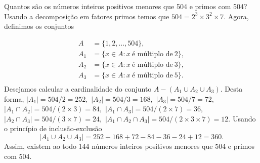 \begin{frame}
\begin{exem}
Quantos são os números inteiros positivos menores que 504 e primos com 504? 
Usando a decomposição em fatores primos temos que $504 = 2^3 \times 3^2 \times 7.$ Agora, definimos os conjuntos 

$$
\begin{aligned}
A & = \{1, 2, \ldots , 504\},\\
A_1 &= \{x \in A : x \ \text{é múltiplo de} \ 2\},\\
A_2 &= \{x \in A : x \ \text{é múltiplo de} \ 3\}, \\
A_3 &= \{x \in A : x \ \text{é múltiplo de} \ 5\}. \\
\end{aligned}
$$
Desejamos calcular a cardinalidade do conjunto $A - (A_1 \cup A_2 \cup A_3 )$. Desta forma, 
$|A_1|= 504/2 = 252,$
$|A_2|= 504/3 = 168,$ 
$|A_3|= 504/7 = 72,$ 
$|A_1 \cap A_2 | = 504/ (2\times 3) = 84,$ 
$|A_1 \cap A_3| = 504/  (2\times 7) = 36,$ 
$|A_2 \cap A_3 | = 504/ (3\times 7)=  24,$  
$|A_1 \cap A_2 \cap A_3 | = 504/ (2\times 3\times 7)=  12. $ 
Usando o princípio de inclusão-exclusão
$$|A_1 \cup A_2 \cup A_3 | = 252 + 168 + 72 - 84 - 36 - 24 + 12 = 360.$$
Assim, existem ao todo 144 números inteiros positivos menores que 504 e primos com 504.
\end{exem}
\end{frame}




